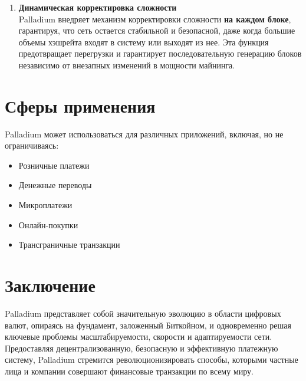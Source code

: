 \documentclass[11pt,a4paper]{article}
\begin{document}
\begin{enumerate}
    \item \textbf{Динамическая корректировка сложности} \\ 
    Palladium внедряет механизм корректировки сложности \textbf{на каждом блоке}, гарантируя, что сеть остается стабильной и безопасной, даже когда большие объемы хэшрейта входят в систему или выходят из нее. Эта функция предотвращает перегрузки и гарантирует последовательную генерацию блоков независимо от внезапных изменений в мощности майнинга.
\end{enumerate}

\section{Сферы применения}
Palladium может использоваться для различных приложений, включая, но не ограничиваясь:
\begin{itemize}
    \item Розничные платежи
    \item Денежные переводы
    \item Микроплатежи
    \item Онлайн-покупки
    \item Трансграничные транзакции
\end{itemize}

\section{Заключение}
Palladium представляет собой значительную эволюцию в области цифровых валют, опираясь на фундамент, заложенный Биткойном, и одновременно решая ключевые проблемы масштабируемости, скорости и адаптируемости сети. Предоставляя децентрализованную, безопасную и эффективную платежную систему, Palladium стремится революционизировать способы, которыми частные лица и компании совершают финансовые транзакции по всему миру.
\end{document}
